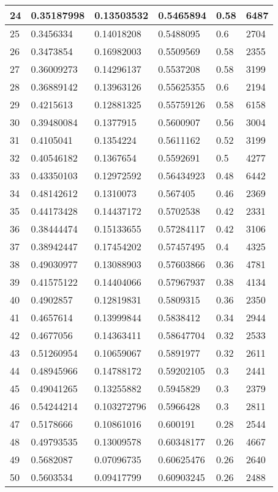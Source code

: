 \begin{longtable}{|l|l|l|l|l|l|}
24 & 0.35187998 & 0.13503532 & 0.5465894 & 0.58 & 6487 \\ \hline 
25 & 0.3456334 & 0.14018208 & 0.5488095 & 0.6 & 2704 \\ \hline 
26 & 0.3473854 & 0.16982003 & 0.5509569 & 0.58 & 2355 \\ \hline 
27 & 0.36009273 & 0.14296137 & 0.5537208 & 0.58 & 3199 \\ \hline 
28 & 0.36889142 & 0.13963126 & 0.55625355 & 0.6 & 2194 \\ \hline 
29 & 0.4215613 & 0.12881325 & 0.55759126 & 0.58 & 6158 \\ \hline 
30 & 0.39480084 & 0.1377915 & 0.5600907 & 0.56 & 3004 \\ \hline 
31 & 0.4105041 & 0.1354224 & 0.5611162 & 0.52 & 3199 \\ \hline 
32 & 0.40546182 & 0.1367654 & 0.5592691 & 0.5 & 4277 \\ \hline 
33 & 0.43350103 & 0.12972592 & 0.56434923 & 0.48 & 6442 \\ \hline 
34 & 0.48142612 & 0.1310073 & 0.567405 & 0.46 & 2369 \\ \hline 
35 & 0.44173428 & 0.14437172 & 0.5702538 & 0.42 & 2331 \\ \hline 
36 & 0.38444474 & 0.15133655 & 0.57284117 & 0.42 & 3106 \\ \hline 
37 & 0.38942447 & 0.17454202 & 0.57457495 & 0.4 & 4325 \\ \hline 
38 & 0.49030977 & 0.13088903 & 0.57603866 & 0.36 & 4781 \\ \hline 
39 & 0.41575122 & 0.14404066 & 0.57967937 & 0.38 & 4134 \\ \hline 
40 & 0.4902857 & 0.12819831 & 0.5809315 & 0.36 & 2350 \\ \hline 
41 & 0.4657614 & 0.13999844 & 0.5838412 & 0.34 & 2944 \\ \hline 
42 & 0.4677056 & 0.14363411 & 0.58647704 & 0.32 & 2533 \\ \hline 
43 & 0.51260954 & 0.10659067 & 0.5891977 & 0.32 & 2611 \\ \hline 
44 & 0.48945966 & 0.14788172 & 0.59202105 & 0.3 & 2441 \\ \hline 
45 & 0.49041265 & 0.13255882 & 0.5945829 & 0.3 & 2379 \\ \hline 
46 & 0.54244214 & 0.103272796 & 0.5966428 & 0.3 & 2811 \\ \hline 
47 & 0.5178666 & 0.10861016 & 0.600191 & 0.28 & 2544 \\ \hline 
48 & 0.49793535 & 0.13009578 & 0.60348177 & 0.26 & 4667 \\ \hline 
49 & 0.5682087 & 0.07096735 & 0.60625476 & 0.26 & 2640 \\ \hline 
50 & 0.5603534 & 0.09417799 & 0.60903245 & 0.26 & 2488 \\ \hline 
\end{longtable}